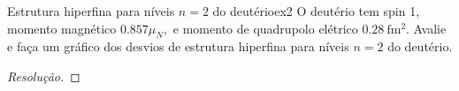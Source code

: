 \begin{exercício}{Estrutura hiperfina para níveis \(n = 2\) do deutério}{ex2}
   O deutério tem spin 1, momento magnético \(0.857\mu_N,\) e momento de quadrupolo elétrico \(\SI{0.28}{\femto\meter^2}\). Avalie e faça um gráfico dos desvios de estrutura hiperfina para níveis \(n = 2\) do deutério.
\end{exercício}
\begin{proof}[Resolução]
    
\end{proof}
